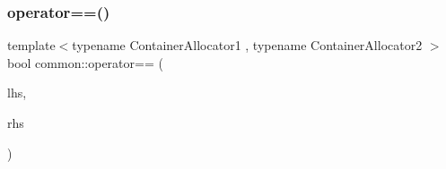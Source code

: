 \subsubsection{\texorpdfstring{operator==()}{operator==()}\hspace{0.1cm}{\footnotesize\ttfamily [2/2]}}
{\footnotesize\ttfamily template$<$typename Container\+Allocator1 , typename Container\+Allocator2 $>$ \\
bool common\+::operator== (\begin{DoxyParamCaption}\item[{const \+::\hyperlink{structcommon_1_1EgoPointClouds__}{common\+::\+Ego\+Point\+Clouds\+\_\+}$<$ Container\+Allocator1 $>$ \&}]{lhs,  }\item[{const \+::\hyperlink{structcommon_1_1EgoPointClouds__}{common\+::\+Ego\+Point\+Clouds\+\_\+}$<$ Container\+Allocator2 $>$ \&}]{rhs }\end{DoxyParamCaption})}

